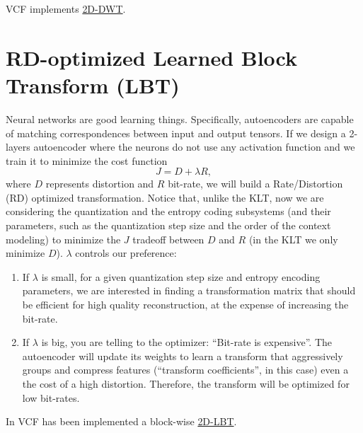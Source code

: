 VCF implements
\href{https://github.com/Sistemas-Multimedia/VCF/blob/main/notebooks/2D-KLT.ipynb}{2D-DWT}.

\section{RD-optimized Learned Block Transform (LBT)}
Neural networks are good learning things. Specifically, autoencoders
are capable of matching correspondences between input and output
tensors. If we design a 2-layers autoencoder where the neurons do not
use any activation function and we train it to minimize the cost
function
\begin{equation}
  J = D + \lambda R,
\end{equation}
where $D$ represents distortion and $R$ bit-rate, we will build a
Rate/Distortion (RD) optimized transformation. Notice that, unlike the
KLT, now we are considering the quantization and the entropy coding
subsystems (and their parameters, such as the quantization step size
and the order of the context modeling) to minimize the $J$ tradeoff
between $D$ and $R$ (in the KLT we only minimize $D$). $\lambda$
controls our preference:
\begin{enumerate}
  \item If $\lambda$ is small, for a given quantization step size and
    entropy encoding parameters, we are interested in finding a
    transformation matrix that should be efficient for high quality
    reconstruction, at the expense of increasing the bit-rate.
  \item If $\lambda$ is big, you are telling to the optimizer:
    ``Bit-rate is expensive''. The autoencoder will update its weights
    to learn a transform that aggressively groups and compress
    features (``transform coefficients'', in this case) even a the
    cost of a high distortion. Therefore, the transform will be
    optimized for low bit-rates.
\end{enumerate}

In VCF has been implemented a block-wise
\href{https://github.com/Sistemas-Multimedia/VCF/blob/main/notebooks/2D-LBT.ipynb}{2D-LBT}.

